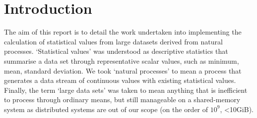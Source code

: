 
\section{Introduction}

The aim of this report is to detail the work undertaken into implementing the calculation of statistical values from large datasets derived from natural processes. `Statistical values' was understood as descriptive statistics that summarise a data set through representative scalar values, such as minimum, mean, standard deviation. We took `natural processes' to mean a process that generates a data stream of continuous values with existing statistical values. Finally, the term `large data sets' was taken to mean anything that is inefficient to process through ordinary means, but still manageable on a shared-memory system as distributed systems are out of our scope (on the order of $10^9$, <10GiB).
